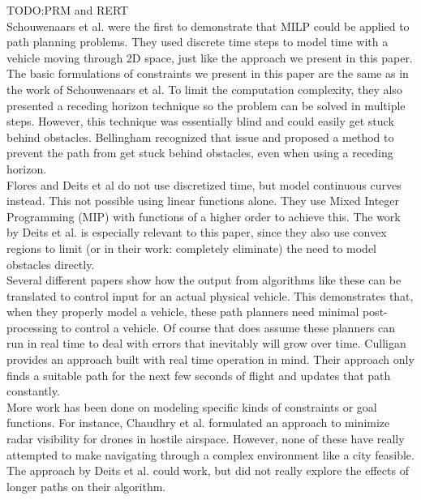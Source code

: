 TODO:PRM and RERT \\

Schouwenaars et al. \cite{Schouwenaars2001} were the first to demonstrate that MILP could be applied to path planning problems. They used discrete time steps to model time with a vehicle moving through 2D space, just like the approach we present in this paper. The basic formulations of constraints we present in this paper are the same as in the work of Schouwenaars et al. To limit the computation complexity, they also presented a receding horizon technique so the problem can be solved in multiple steps. However, this technique was essentially blind and could easily get stuck behind obstacles. Bellingham\cite{Bellingham2002} recognized that issue and proposed a method to prevent the path from get stuck behind obstacles, even when using a receding horizon. \\

Flores\cite{Flores2007} and Deits et al\cite{Deits2015} do not use discretized time, but model continuous curves instead. This not possible using linear functions alone. They use Mixed Integer Programming (MIP) with functions of a higher order to achieve this. The work by Deits et al. is especially relevant to this paper, since they also use convex regions to limit (or in their work: completely eliminate) the need to model obstacles directly. \\

Several different papers \cite{Fliess1995a, Hao2005, Cowling2007, Mellinger2011} show how the output from algorithms like these can be translated to control input for an actual physical vehicle. This demonstrates that, when they properly model a vehicle, these path planners need minimal post-processing to control a vehicle. Of course that does assume these planners can run in real time to deal with errors that inevitably will grow over time. Culligan \cite{Culligan2006} provides an approach built with real time operation in mind. Their approach only finds a suitable path for the next few seconds of flight and updates that path constantly. \\

More work has been done on modeling specific kinds of constraints or goal functions. For instance, Chaudhry et al. \cite{Chaudhry2004} formulated an approach to minimize radar visibility for drones in hostile airspace. However, none of these have really attempted to make navigating through a complex environment like a city feasible. The approach by Deits et al. \cite{Deits2015} could work, but did not really explore the effects of longer paths on their algorithm.
